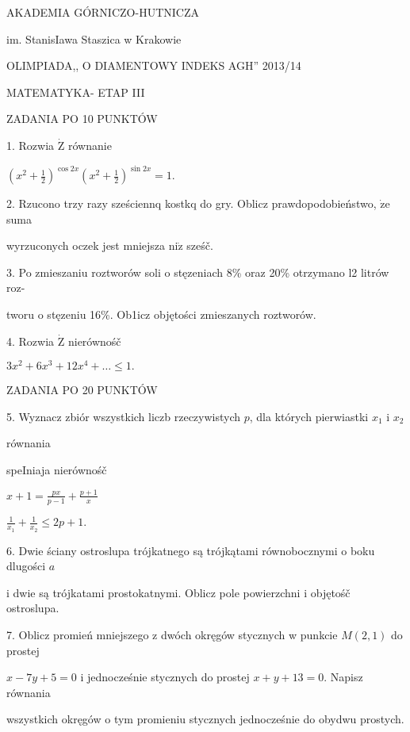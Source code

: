 \documentclass[a4paper,12pt]{article}
\begin{document}
AKADEMIA GÓRNICZO-HUTNICZA

im. StanisIawa Staszica w Krakowie

OLIMPIADA,, O DIAMENTOWY INDEKS AGH'' 2013/14

MATEMATYKA- ETAP III

ZADANIA PO 10 PUNKTÓW

1. Rozwia $\dot{\mathrm{Z}}$ równanie

$(x^{2}+\displaystyle \frac{1}{2})^{\cos 2x}(x^{2}+\frac{1}{2})^{\sin 2x}=1.$

2. Rzucono trzy razy sześciennq kostkq do gry. Oblicz prawdopodobieństwo, $\dot{\mathrm{z}}\mathrm{e}$ suma

wyrzuconych oczek jest mniejsza $\mathrm{n}\mathrm{i}\dot{\mathrm{z}}$ sześč.

3. Po zmieszaniu roztworów soli o stęzeniach 8\% oraz 20\% otrzymano l2 litrów roz-

tworu o stęzeniu 16\%. Ob1icz objętości zmieszanych roztworów.

4. Rozwia $\dot{\mathrm{Z}}$ nierównośč

$3x^{2}+6x^{3}+12x^{4}+\ldots\leq 1.$

ZADANIA PO 20 PUNKTÓW

5. Wyznacz zbiór wszystkich liczb rzeczywistych $p$, dla których pierwiastki $x_{1}$ i $x_{2}$

równania

speIniaja nierównośč

$x+1=\displaystyle \frac{px}{p-1}+\frac{p+1}{x}$

$\displaystyle \frac{1}{x_{1}}+\frac{1}{x_{2}}\leq 2p+1.$

6. Dwie ściany ostroslupa trójkatnego są trójkątami równobocznymi o boku dlugości $a$

i dwie są trójkatami prostokatnymi. Oblicz pole powierzchni i objętośč ostroslupa.

7. Oblicz promień mniejszego z dwóch okręgów stycznych w punkcie $M(2,1)$ do prostej

$x-7y+5=0$ i jednocześnie stycznych do prostej $x+y+13=0$. Napisz równania

wszystkich okręgów o tym promieniu stycznych jednocześnie do obydwu prostych.
\end{document}
